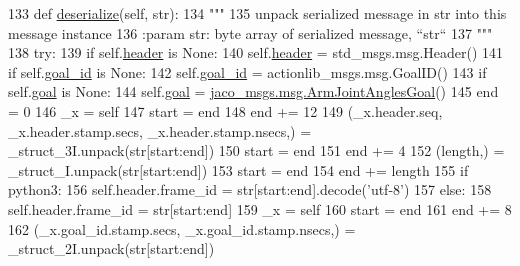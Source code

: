 \begin{DoxyCode}
133   \textcolor{keyword}{def }\hyperlink{classjaco__msgs_1_1msg_1_1__ArmJointAnglesActionGoal_1_1ArmJointAnglesActionGoal_a2c0e8d441ed95ea66a3cea70f5756f91}{deserialize}(self, str):
134     \textcolor{stringliteral}{"""}
135 \textcolor{stringliteral}{    unpack serialized message in str into this message instance}
136 \textcolor{stringliteral}{    :param str: byte array of serialized message, ``str``}
137 \textcolor{stringliteral}{    """}
138     \textcolor{keywordflow}{try}:
139       \textcolor{keywordflow}{if} self.\hyperlink{classjaco__msgs_1_1msg_1_1__ArmJointAnglesActionGoal_1_1ArmJointAnglesActionGoal_aaea49c5d26e095d3e05e1164e8b78f88}{header} \textcolor{keywordflow}{is} \textcolor{keywordtype}{None}:
140         self.\hyperlink{classjaco__msgs_1_1msg_1_1__ArmJointAnglesActionGoal_1_1ArmJointAnglesActionGoal_aaea49c5d26e095d3e05e1164e8b78f88}{header} = std\_msgs.msg.Header()
141       \textcolor{keywordflow}{if} self.\hyperlink{classjaco__msgs_1_1msg_1_1__ArmJointAnglesActionGoal_1_1ArmJointAnglesActionGoal_a7c8303d67ea7eab4c1eb71988d980183}{goal\_id} \textcolor{keywordflow}{is} \textcolor{keywordtype}{None}:
142         self.\hyperlink{classjaco__msgs_1_1msg_1_1__ArmJointAnglesActionGoal_1_1ArmJointAnglesActionGoal_a7c8303d67ea7eab4c1eb71988d980183}{goal\_id} = actionlib\_msgs.msg.GoalID()
143       \textcolor{keywordflow}{if} self.\hyperlink{classjaco__msgs_1_1msg_1_1__ArmJointAnglesActionGoal_1_1ArmJointAnglesActionGoal_ad21a72cdb415ceec3c8f770f97a2f445}{goal} \textcolor{keywordflow}{is} \textcolor{keywordtype}{None}:
144         self.\hyperlink{classjaco__msgs_1_1msg_1_1__ArmJointAnglesActionGoal_1_1ArmJointAnglesActionGoal_ad21a72cdb415ceec3c8f770f97a2f445}{goal} = \hyperlink{classjaco__msgs_1_1msg_1_1__ArmJointAnglesGoal_1_1ArmJointAnglesGoal}{jaco\_msgs.msg.ArmJointAnglesGoal}()
145       end = 0
146       \_x = self
147       start = end
148       end += 12
149       (\_x.header.seq, \_x.header.stamp.secs, \_x.header.stamp.nsecs,) = \_struct\_3I.unpack(str[start:end])
150       start = end
151       end += 4
152       (length,) = \_struct\_I.unpack(str[start:end])
153       start = end
154       end += length
155       \textcolor{keywordflow}{if} python3:
156         self.header.frame\_id = str[start:end].decode(\textcolor{stringliteral}{'utf-8'})
157       \textcolor{keywordflow}{else}:
158         self.header.frame\_id = str[start:end]
159       \_x = self
160       start = end
161       end += 8
162       (\_x.goal\_id.stamp.secs, \_x.goal\_id.stamp.nsecs,) = \_struct\_2I.unpack(str[start:end])

\end{DoxyCode}
